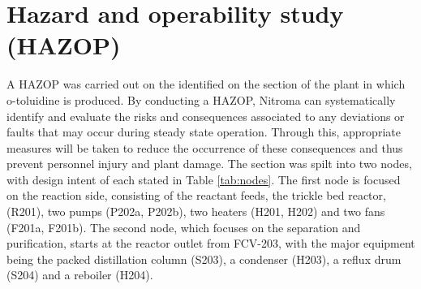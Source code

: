 \section{Hazard and operability study (HAZOP) }
 
A HAZOP was carried out on the identified on the section of the plant in which o-toluidine is produced. By conducting a HAZOP, Nitroma can systematically identify and evaluate the risks and consequences associated to any deviations or faults that may occur during steady state operation. Through this, appropriate measures will be taken to reduce the occurrence of these consequences and thus prevent personnel injury and plant damage. The section was spilt into two nodes, with design intent of each stated in Table \ref{tab:nodes}. The first node is focused on the reaction side, consisting of the reactant feeds, the trickle bed reactor, (R201), two pumps (P202a, P202b), two heaters (H201, H202) and two fans (F201a, F201b). The second node, which focuses on the separation and purification, starts at the reactor outlet from FCV-203, with the major equipment being the packed distillation column (S203), a condenser (H203), a reflux drum (S204) and a reboiler (H204). 

 



